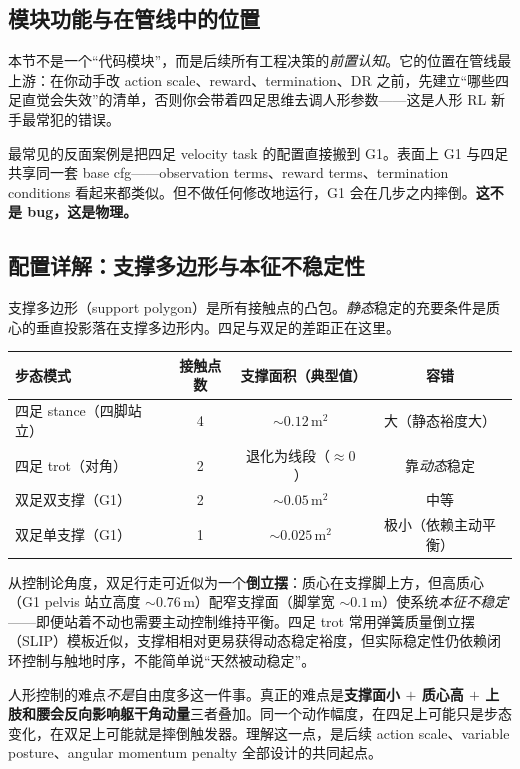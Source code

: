 \subsection{模块功能与在管线中的位置}
本节不是一个“代码模块”，而是后续所有工程决策的\emph{前置认知}。它的位置在管线最上游：在你动手改 action scale、reward、termination、DR 之前，先建立“哪些四足直觉会失效”的清单，否则你会带着四足思维去调人形参数——这是人形 RL 新手最常犯的错误。

最常见的反面案例是把四足 velocity task 的配置直接搬到 G1。表面上 G1 与四足共享同一套 base cfg——observation terms、reward terms、termination conditions 看起来都类似。但不做任何修改地运行，G1 会在几步之内摔倒。\textbf{这不是 bug，这是物理。}

\subsection{配置详解：支撑多边形与本征不稳定性}
支撑多边形（support polygon）是所有接触点的凸包。\emph{静态}稳定的充要条件是质心的垂直投影落在支撑多边形内。四足与双足的差距正在这里。

\begin{center}
\small
\begin{tabular}{lccc}
\hline
步态模式 & 接触点数 & 支撑面积（典型值） & 容错 \\
\hline
四足 stance（四脚站立） & 4 & $\sim 0.12\,\mathrm{m}^2$ & 大（静态裕度大） \\
四足 trot（对角） & 2 & 退化为线段（$\approx 0$） & 靠\emph{动态}稳定 \\
双足双支撑（G1） & 2 & $\sim 0.05\,\mathrm{m}^2$ & 中等 \\
双足单支撑（G1） & 1 & $\sim 0.025\,\mathrm{m}^2$ & 极小（依赖主动平衡） \\
\hline
\end{tabular}
\end{center}

从控制论角度，双足行走可近似为一个\textbf{倒立摆}：质心在支撑脚上方，但高质心（G1 pelvis 站立高度 $\sim 0.76$\,m）配窄支撑面（脚掌宽 $\sim 0.1$\,m）使系统\emph{本征不稳定}——即便站着不动也需要主动控制维持平衡。四足 trot 常用弹簧质量倒立摆（SLIP）模板近似，支撑相相对更易获得动态稳定裕度，但实际稳定性仍依赖闭环控制与触地时序，不能简单说“天然被动稳定”。

\begin{insight}\label{ins:rlmc-hl-essence}
人形控制的难点\emph{不是}自由度多这一件事。真正的难点是\textbf{支撑面小 $+$ 质心高 $+$ 上肢和腰会反向影响躯干角动量}三者叠加。同一个动作幅度，在四足上可能只是步态变化，在双足上可能就是摔倒触发器。理解这一点，是后续 action scale、variable posture、angular momentum penalty 全部设计的共同起点。
\end{insight}

